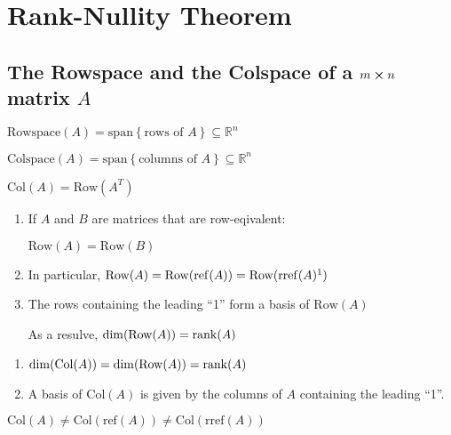 \chapter{Rank-Nullity Theorem}

\section{The Rowspace and the Colspace of a $m \cross n$ matrix $A$}

\begin{definition}
	$\mathrm{Rowspace}(A) = \mathrm{span}\left\{\text{rows of $A$}\right\} \subseteq \mathbb{R}^n$
\end{definition}

\begin{definition}
	$\mathrm{Colspace}(A) = \mathrm{span}\left\{\text{columns of $A$}\right\} \subseteq \mathbb{R}^n$

	$\mathrm{Col}(A) = \mathrm{Row}(A^T)$
\end{definition}

\begin{theorem}[Rowspace]
	\begin{enumerate}
		\item If $A$ and $B$ are matrices that are row-eqivalent:
		
		$\mathrm{Row}(A) = \mathrm{Row}(B)$

		\item In particular, $\mathrm{Row}(A) = \mathrm{Row}(\mathrm{ref}(A)) = \mathrm{Row}(\mathrm{rref}(A)\footnotemark)$ 
		\item The rows containing the leading ``1'' form a basis of $\mathrm{Row}(A)$
		
		As a resulve, $\dim(\mathrm{Row}(A)) = \rank(A)$
	\end{enumerate}
\end{theorem}

\begin{theorem}[Colspace]
	\begin{enumerate}
		\item $\dim(\mathrm{Col}(A)) = \dim(\mathrm{Row}(A)) = \rank(A)$
		\item A basis of $\mathrm{Col}(A)$ is given by the columns of $A$ containing the leading ``1''.
	\end{enumerate}
\end{theorem}

\begin{remark}
	$\mathrm{Col}(A) \neq \mathrm{Col}(\mathrm{ref}(A)) \neq \mathrm{Col}(\mathrm{rref}(A))$
\end{remark}

